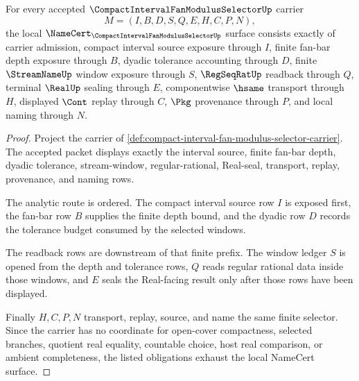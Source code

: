 \begin{theorem}
\label{thm:compact-interval-fan-modulus-selector-obligations}
For every accepted $\CompactIntervalFanModulusSelectorUp$ carrier
$$
M=(I,B,D,S,Q,E,H,C,P,N),
$$
the local $\NameCert_{\CompactIntervalFanModulusSelectorUp}$ surface consists exactly of carrier admission, compact interval source exposure through $I$, finite fan-bar depth exposure through $B$, dyadic tolerance accounting through $D$, finite $\StreamNameUp$ window exposure through $S$, $\RegSeqRatUp$ readback through $Q$, terminal $\RealUp$ sealing through $E$, componentwise $\hsame$ transport through $H$, displayed $\Cont$ replay through $C$, $\Pkg$ provenance through $P$, and local naming through $N$.
\end{theorem}
\begin{proof}
Project the carrier of \autoref{def:compact-interval-fan-modulus-selector-carrier}. The accepted packet displays exactly the interval source, finite fan-bar depth, dyadic tolerance, stream-window, regular-rational, Real-seal, transport, replay, provenance, and naming rows.

The analytic route is ordered. The compact interval source row $I$ is exposed first, the fan-bar row $B$ supplies the finite depth bound, and the dyadic row $D$ records the tolerance budget consumed by the selected windows.

The readback rows are downstream of that finite prefix. The window ledger $S$ is opened from the depth and tolerance rows, $Q$ reads regular rational data inside those windows, and $E$ seals the Real-facing result only after those rows have been displayed.

Finally $H,C,P,N$ transport, replay, source, and name the same finite selector. Since the carrier has no coordinate for open-cover compactness, selected branches, quotient real equality, countable choice, host real comparison, or ambient completeness, the listed obligations exhaust the local NameCert surface.
\end{proof}

